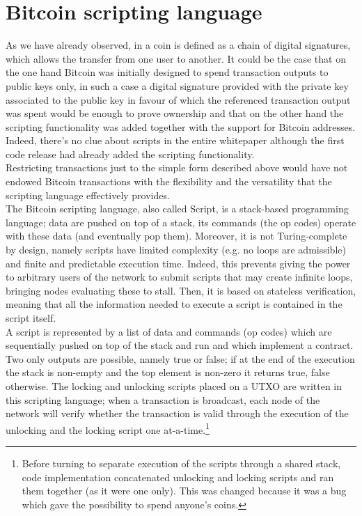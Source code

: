 \section{Bitcoin scripting language}
\label{sec::scripts}
As we have already observed, in \cite{Nakamoto_bitcoin:a} a coin is defined as a chain of digital signatures, which allows the transfer from one user to another. It could be the case that on the one hand Bitcoin was initially designed to spend transaction outputs to public keys only, in such a case a digital signature provided with the private key associated to the public key in favour of which the referenced transaction output was spent would be enough to prove ownership and that on the other hand the scripting functionality was added together with the support for Bitcoin addresses. Indeed, there's no clue about scripts in the entire whitepaper although the first code release had already added the scripting functionality.\\
Restricting transactions just to the simple form described above would have not endowed Bitcoin transactions with the flexibility and the versatility that the scripting language effectively provides.\\
The Bitcoin scripting language, also called Script, is a stack-based programming language; data are pushed on top of a stack, its commands (the op codes) operate with these data (and eventually pop them). Moreover, it is not Turing-complete by design, namely scripts have limited complexity (e.g. no loops are admissible) and finite and predictable execution time. Indeed, this prevents giving the power to arbitrary users of the network to submit scripts that may create infinite loops, bringing nodes evaluating these to stall. Then, it is based on stateless verification, meaning that all the information needed to execute a script is contained in the script itself.\\
A script is represented by a list of data and commands (op codes) which are sequentially pushed on top of the stack and run and which implement a contract. Two only outputs are possible, namely true or false; if at the end of the execution the stack is non-empty and the top element is non-zero it returns true, false otherwise. The locking and unlocking scripts placed on a UTXO are written in this scripting language; when a transaction is broadcast, each node of the network will verify whether the transaction is valid through the execution of the unlocking and the locking script one at-a-time.\footnote{Before turning to separate execution of the scripts through a shared stack, code implementation concatenated unlocking and locking scripts and ran them together (as it were one only). This was changed because it was a bug which gave the possibility to spend anyone's coins.} \\

